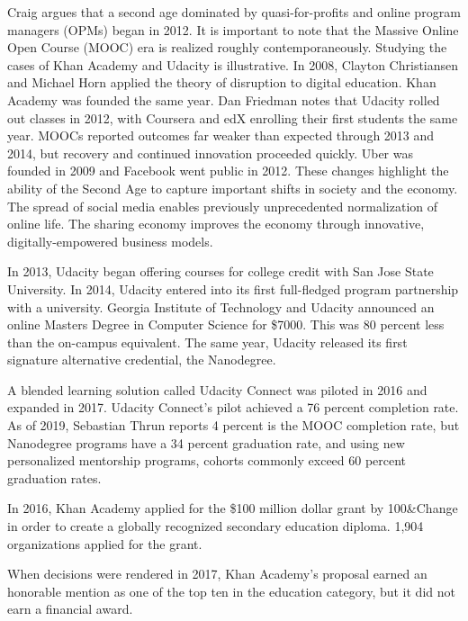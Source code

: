 \documentclass[review]{elsarticle}
\begin{document}
Craig argues that a second age dominated by quasi-for-profits and online program managers (OPMs) began in 2012.
It is important to note that the Massive Online Open Course (MOOC) era is realized roughly contemporaneously.
Studying the cases of Khan Academy and Udacity is illustrative.
In 2008, Clayton Christiansen and Michael Horn applied the theory of disruption to digital education\cite{horn2008disrupting}.
Khan Academy was founded the same year\cite{tucker_2018}.
Dan Friedman\cite{friedman2014mooc} notes that Udacity rolled out classes in 2012, with Coursera and edX enrolling their first students the same year.
MOOCs reported outcomes far weaker than expected through 2013 and 2014, but recovery and continued innovation proceeded quickly.
Uber was founded in 2009 and Facebook went public in 2012.
These changes highlight the ability of the Second Age to capture important shifts in society and the economy.
The spread of social media enables previously unprecedented normalization of online life.
The sharing economy improves the economy through innovative, digitally-empowered business models.

In 2013, Udacity began offering courses for college credit with San Jose State University\cite{shen_2015}.
In 2014, Udacity entered into its first full-fledged program partnership with a university.
Georgia Institute of Technology and Udacity announced an online Masters Degree in Computer Science for \$7000.
This was 80 percent less than the on-campus equivalent\cite{onink2013georgia}.
The same year, Udacity released its first signature alternative credential, the Nanodegree.

A blended learning solution called Udacity Connect was piloted in 2016 and expanded in 2017.
Udacity Connect's pilot achieved a 76 percent completion rate\cite{shah_2018}.
As of 2019, Sebastian Thrun reports 4 percent is the MOOC completion rate,
but Nanodegree programs have a 34 percent graduation rate, and using new personalized mentorship programs, cohorts commonly exceed 60 percent graduation rates.

In 2016, Khan Academy applied for the \$100 million dollar grant
by 100\&Change in order to create a globally recognized secondary education diploma.
1,904 organizations applied for the grant\cite{conrad_2016}.


When decisions were rendered in 2017, Khan Academy's proposal earned an honorable mention as one of the top ten in the education category,
but it did not earn a financial award\cite{cushing_2017}.
\end{document}

